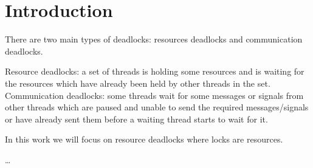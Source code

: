 \chapter{Introduction}


There are two main types of deadlocks: resources deadlocks and communication deadlocks.

Resource deadlocks: a set of threads is holding some resources and is waiting for the resources which have already been held by other threads in the set.
Communication deadlocks: some threads wait for some messages or signals from other threads which are paused and unable to send the required messages/signals or have already sent them before a waiting thread starts to wait for it.

In this work we will focus on resource deadlocks where locks are resources.

\dots